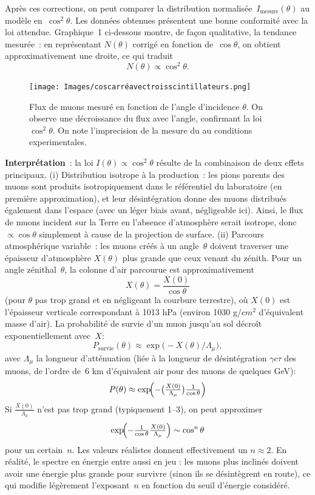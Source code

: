 \documentclass[a4paper,12pt,twoside]{article}
\begin{document}
Après ces corrections, on peut comparer la distribution normalisée~$I_{\mathrm{mesure}}(\theta)$ au modèle en~$\cos^{2}\theta$. Les données obtenues présentent une bonne conformité avec la loi attendue. Graphique~1 ci‑dessous montre, de façon qualitative, la tendance mesurée~: en représentant $N(\theta)$ corrigé en fonction de~$\cos\theta$, on obtient approximativement une droite, ce qui traduit
\[
N(\theta)\propto\cos^{2}\theta.
\]
\begin{figure}[H]
  \centering
  \texttt{[image: Images/coscarréavectroisscintillateurs.png]}
  \caption{Flux de muons mesuré en fonction de l'angle d'incidence $\theta$. On observe une décroissance du flux avec l'angle, confirmant la loi $\cos^2\theta$. On note l'imprecision de la mesure du au conditions experimentales.}
  \label{fig:cos2s}
\end{figure}

\textbf{Interprétation}~: la loi $I(\theta)\propto\cos^2\theta$ résulte de la combinaison de deux effets principaux.  
(i) Distribution isotrope à la production~: les pions parents des muons sont produits isotropiquement dans le référentiel du laboratoire (en première approximation), et leur désintégration donne des muons distribués également dans l'espace (avec un léger biais avant, négligeable ici). Ainsi, le flux de muons incident sur la Terre en l'absence d'atmosphère serait isotrope, donc $\propto\cos\theta$ simplement à cause de la projection de surface.  
(ii) Parcours atmosphérique variable~: les muons créés à un angle~$\theta$ doivent traverser une épaisseur d'atmosphère $X(\theta)$ plus grande que ceux venant du zénith. Pour un angle zénithal~$\theta$, la colonne d'air parcourue est approximativement
\[
X(\theta)=\frac{X(0)}{\cos\theta}
\]
(pour $\theta$ pas trop grand et en négligeant la courbure terrestre), où $X(0)$ est l'épaisseur verticale correspondant à 1013 hPa (environ 1030 g/$cm^2$ d'équivalent masse d'air). La probabilité de survie d'un muon jusqu'au sol décroît exponentiellement avec~$X$:
\[
P_{\mathrm{survie}}(\theta)\approx\exp\bigl(-X(\theta)/\Lambda_{\mu}\bigr),
\]
avec $\Lambda_{\mu}$ la longueur d'atténuation (liée à la longueur de désintégration $\gamma c\tau$ des muons, de l'ordre de~6 km d'équivalent air pour des muons de quelques GeV):
\[
P(\theta)\approx \exp\!\Bigl(-\bigl(\tfrac{X(0)}{\Lambda_\mu}\bigr)\tfrac1{\cos\theta}\Bigr)
\]
Si $\tfrac{X(0)}{\Lambda_\mu}$ n'est pas trop grand (typiquement 1--3), on peut approximer 
\[
\exp\!\Bigl(-\tfrac1{\cos\theta}\tfrac{X(0)}{\Lambda_\mu}\Bigr)\sim\cos^n\theta
\]
pour un certain~$n$. Les valeurs réalistes donnent effectivement un $n\approx2$. En réalité, le spectre en énergie entre aussi en jeu : les muons plus inclinés doivent avoir une énergie plus grande pour survivre (sinon ils se désintègrent en route), ce qui modifie légèrement l'exposant~$n$ en fonction du seuil d'énergie considéré. 
\end{document}
